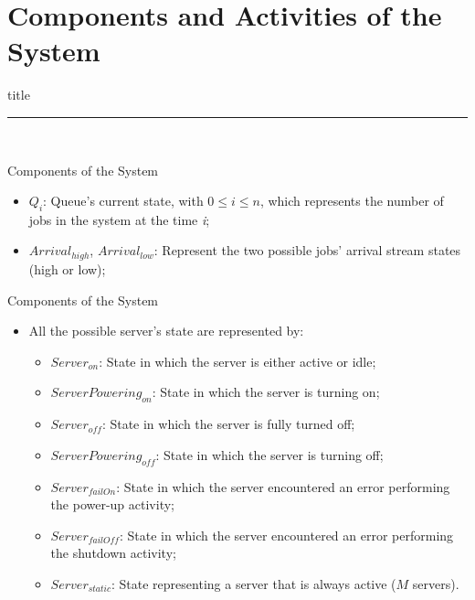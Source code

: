 \documentclass[8pt]{beamer}
\begin{document}
\section{Components and Activities of the System}
    \begin{frame}[plain]
        \vfill
        \centering
        \begin{beamercolorbox}[sep=8pt,center,shadow=true,rounded=true]{title}
            \insertsectionhead\par
            \color{univered}\noindent\rule{10cm}{1pt} \\
            \LARGE{\faFileTextO}
        \end{beamercolorbox}
        \vfill
    \end{frame}

    \begin{frame}{Components of the System}
        \begin{itemize}
            \item \(Q_{i}\): Queue's current state, with \(0\leq i \leq n\), which represents the number of jobs in the system at the time \textit{i};
            \item \(Arrival_{high}\), \(Arrival_{low}\): Represent the two possible jobs' arrival stream states (high or low);
        \end{itemize}
    \end{frame}

    \begin{frame}{Components of the System}
        \begin{itemize}
            \item All the possible server's state are represented by:
            \begin{itemize}
                \item \(Server_{on}\): State in which the server is either active or idle;
                \item \(ServerPowering_{on}\): State in which the server is turning on;
                \item \(Server_{off}\): State in which the server is fully turned off;
                \item \(ServerPowering_{off}\): State in which the server is turning off;
                \item \(Server_{failOn}\): State in which the server encountered an error performing the power-up activity;
                \item \(Server_{failOff}\): State in which the server encountered an error performing the shutdown activity;
                \item \(Server_{static}\): State representing a server that is always active (\(M\) servers).
            \end{itemize}
        \end{itemize}
    \end{frame}
\end{document}
